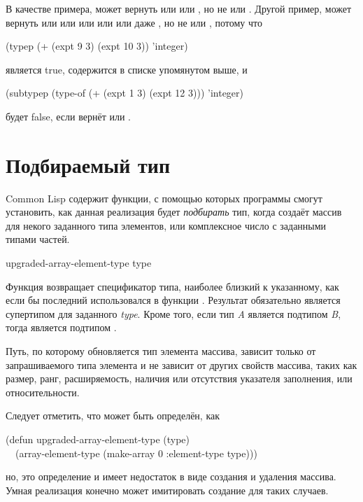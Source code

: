 \begin{defun}[Функция]
В качестве примера,  может вернуть
 или  или , но не
 или .
Другой пример,  может вернуть  или 
или  или  или  или даже , но не  или , потому что
\begin{lisp}
(typep (+ (expt 9 3) (expt 10 3)) 'integer)
\end{lisp}
является true,  содержится в списке упомянутом выше, и 
\begin{lisp}
(subtypep (type-of (+ (expt 1 3) (expt 12 3))) 'integer)
\end{lisp}
будет false, если  вернёт  или .
\end{defun}

\section{Подбираемый тип}

Common Lisp содержит функции, с помощью которых программы смогут установить, как
данная реализация будет \emph{подбирать} тип, когда создаёт массив для некого
заданного типа элементов, или комплексное число с заданными типами частей.

\begin{defun}[Функция]
upgraded-array-element-type type

Функция возвращает спецификатор типа, наиболее близкий к указанному, как если бы
последний использовался в функции .
Результат обязательно является супертипом для заданного \emph{type}.
Кроме того, если тип \emph{A} является подтипом \emph{B}, тогда 
 является подтипом
.

Путь, по которому обновляется тип элемента массива, зависит только от запрашиваемого
типа элемента и не зависит от других свойств массива, таких как размер, ранг, 
расширяемость, наличия или отсутствия указателя заполнения, или относительности.

Следует отметить, что  может быть определён,
как
\begin{lisp}
(defun upgraded-array-element-type (type) \\
~~(array-element-type (make-array 0 :element-type type)))
\end{lisp}
но, это определение и имеет недостаток в виде создания и удаления массива. Умная
реализация конечно может имитировать создание для таких случаев.
\end{defun}


